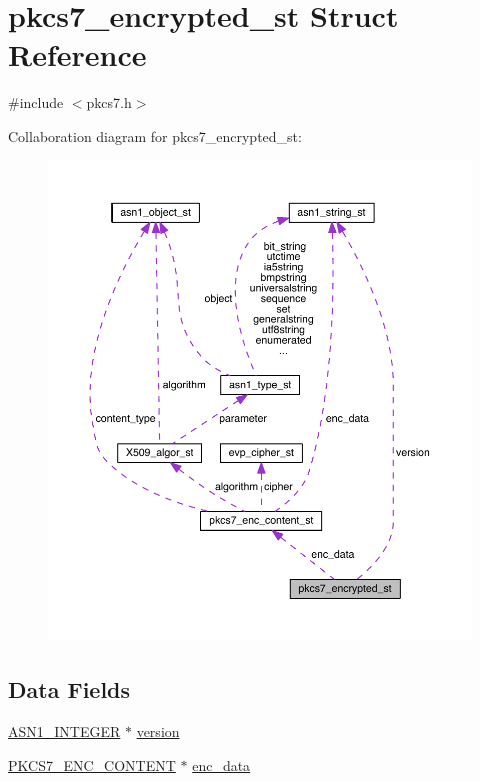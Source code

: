 \hypertarget{structpkcs7__encrypted__st}{}\section{pkcs7\+\_\+encrypted\+\_\+st Struct Reference}
\label{structpkcs7__encrypted__st}


{\ttfamily \#include $<$pkcs7.\+h$>$}



Collaboration diagram for pkcs7\+\_\+encrypted\+\_\+st\+:\nopagebreak
\begin{figure}[H]
\begin{center}
\leavevmode
\includegraphics[width=350pt]{structpkcs7__encrypted__st__coll__graph}
\end{center}
\end{figure}
\subsection*{Data Fields}
\begin{DoxyCompactItemize}
\item 
\hyperlink{crypto_2ossl__typ_8h_af4335399bf9774cb410a5e93de65998b}{A\+S\+N1\+\_\+\+I\+N\+T\+E\+G\+ER} $\ast$ \hyperlink{structpkcs7__encrypted__st_abf367aeef355b6acf5be7c569c4b28b0}{version}
\item 
\hyperlink{crypto_2pkcs7_2pkcs7_8h_a4f2b044f01d16eb516f9027409e57d3a}{P\+K\+C\+S7\+\_\+\+E\+N\+C\+\_\+\+C\+O\+N\+T\+E\+NT} $\ast$ \hyperlink{structpkcs7__encrypted__st_a39e0a8da41ac4871f293d76368a9a0e7}{enc\+\_\+data}
\end{DoxyCompactItemize}


